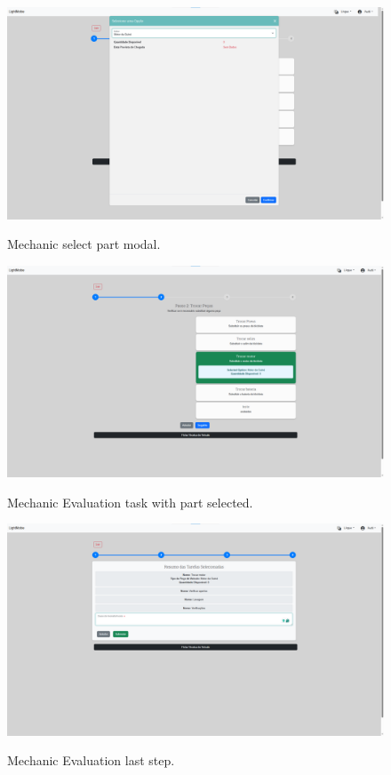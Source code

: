 \begin{figure}[h]
  \caption{Mechanic select part modal.}
  \centering
  \includegraphics[width=\textwidth]{figs/Implementation/mechanic/MechanicEvaluationSelectTaskWitPart}
  \label{fig:MechanicEvaluationSelectTaskWitPart}
\end{figure}

\begin{figure}[h]
  \caption{Mechanic Evaluation task with part selected.}
  \centering
  \includegraphics[width=\textwidth]{figs/Implementation/mechanic/TaskSelected}
  \label{fig:TaskSelected}
\end{figure}


\begin{figure}[h]
  \caption{Mechanic Evaluation last step.}
  \centering
  \includegraphics[width=\textwidth]{figs/Implementation/mechanic/EvaluationLastStep}
  \label{fig:EvaluationLastStep}
\end{figure}


